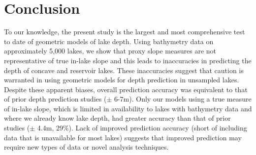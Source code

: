 \documentclass[draft]{agujournal2019}
\begin{document}
\section{Conclusion}
\noindent
To our knowledge, the present study is the largest and most comprehensive test to date of geometric models of lake depth. Using bathymetry data on approximately 5,000 lakes, we show that proxy slope measures are not representative of true in-lake slope and this leads to inaccuracies in predicting the depth of concave and reservoir lakes. These inaccuracies suggest that caution is warranted in using geometric models for depth prediction in unsampled lakes. Despite these apparent biases, overall prediction accuracy was equivalent to that of prior depth prediction studies ($\pm$ 6-7m). Only our models using a true measure of in-lake slope, which is limited in availability to lakes with bathymetry data and where we already know lake depth, had greater accuracy than that of prior studies ($\pm$ 4.4m, 29\%). Lack of improved prediction accuracy (short of including data that is unavailable for most lakes) suggests that improved prediction may require new types of data or novel analysis techniques.


%
%
%
%
%
%
%
%
%
%
\end{document}
